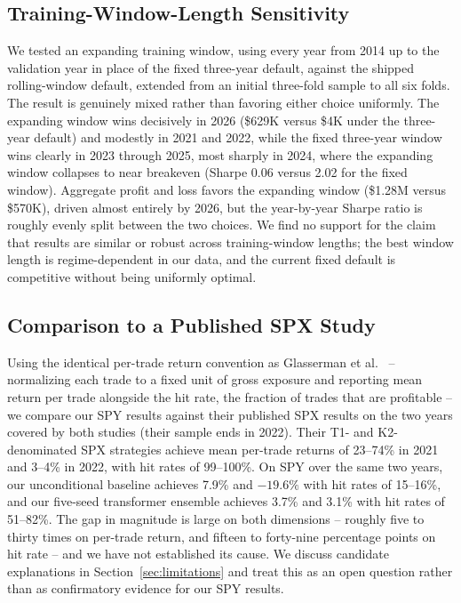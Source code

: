 \documentclass[sigconf,review,anonymous]{acmart}
\begin{document}
\subsection{Training-Window-Length Sensitivity}
\label{sec:window}
We tested an expanding training window, using every year from 2014 up to the validation year in place of the fixed three-year default, against the shipped rolling-window default, extended from an initial three-fold sample to all six folds. The result is genuinely mixed rather than favoring either choice uniformly. The expanding window wins decisively in 2026 (\$629K versus \$4K under the three-year default) and modestly in 2021 and 2022, while the fixed three-year window wins clearly in 2023 through 2025, most sharply in 2024, where the expanding window collapses to near breakeven (Sharpe 0.06 versus 2.02 for the fixed window). Aggregate profit and loss favors the expanding window (\$1.28M versus \$570K), driven almost entirely by 2026, but the year-by-year Sharpe ratio is roughly evenly split between the two choices. We find no support for the claim that results are similar or robust across training-window lengths; the best window length is regime-dependent in our data, and the current fixed default is competitive without being uniformly optimal.

\subsection{Comparison to a Published SPX Study}
\label{sec:spx-benchmark}
Using the identical per-trade return convention as Glasserman et al.~\cite{glasserman2025tp2} -- normalizing each trade to a fixed unit of gross exposure and reporting mean return per trade alongside the hit rate, the fraction of trades that are profitable -- we compare our SPY results against their published SPX results on the two years covered by both studies (their sample ends in 2022). Their T1- and K2-denominated SPX strategies achieve mean per-trade returns of 23--74\% in 2021 and 3--4\% in 2022, with hit rates of 99--100\%. On SPY over the same two years, our unconditional baseline achieves 7.9\% and $-19.6\%$ with hit rates of 15--16\%, and our five-seed transformer ensemble achieves 3.7\% and 3.1\% with hit rates of 51--82\%. The gap in magnitude is large on both dimensions -- roughly five to thirty times on per-trade return, and fifteen to forty-nine percentage points on hit rate -- and we have not established its cause. We discuss candidate explanations in Section~\ref{sec:limitations} and treat this as an open question rather than as confirmatory evidence for our SPY results.
\end{document}
